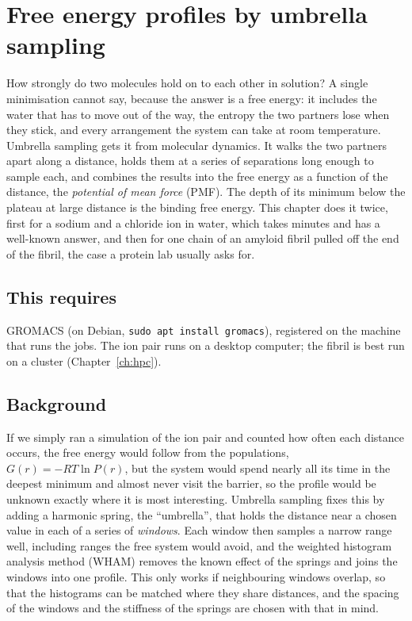 \chapter{Free energy profiles by umbrella sampling}
\label{ch:umbrella}

How strongly do two molecules hold on to each other in solution? A single minimisation cannot say, because the answer is a free energy: it includes the water that has to move out of the way, the entropy the two partners lose when they stick, and every arrangement the system can take at room temperature. Umbrella sampling gets it from molecular dynamics. It walks the two partners apart along a distance, holds them at a series of separations long enough to sample each, and combines the results into the free energy as a function of the distance, the \emph{potential of mean force} (PMF). The depth of its minimum below the plateau at large distance is the binding free energy. This chapter does it twice, first for a sodium and a chloride ion in water, which takes minutes and has a well-known answer, and then for one chain of an amyloid fibril pulled off the end of the fibril, the case a protein lab usually asks for.

\section*{This requires}
GROMACS (on Debian, \texttt{sudo apt install gromacs}), registered on the machine that runs the jobs. The ion pair runs on a desktop computer; the fibril is best run on a cluster (Chapter~\ref{ch:hpc}).

\section{Background}
If we simply ran a simulation of the ion pair and counted how often each distance occurs, the free energy would follow from the populations, $G(r) = -RT\ln P(r)$, but the system would spend nearly all its time in the deepest minimum and almost never visit the barrier, so the profile would be unknown exactly where it is most interesting. Umbrella sampling fixes this by adding a harmonic spring, the ``umbrella'', that holds the distance near a chosen value in each of a series of \emph{windows}. Each window then samples a narrow range well, including ranges the free system would avoid, and the weighted histogram analysis method (WHAM) removes the known effect of the springs and joins the windows into one profile. This only works if neighbouring windows overlap, so that the histograms can be matched where they share distances, and the spacing of the windows and the stiffness of the springs are chosen with that in mind.

